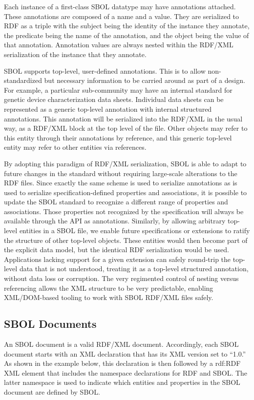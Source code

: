 Each instance of a first-class SBOL datatype may have annotations attached. These annotations are composed of a name and a value.  They are serialized to RDF as a triple with the subject being the identity of the instance they annotate, the predicate being the name of the annotation, and the object being the value of that annotation. Annotation values are always nested within the RDF/XML serialization of the instance that they annotate.

SBOL supports top-level, user-defined annotations. This is to allow non-standardized but necessary information to be carried around as part of a design. For example, a particular sub-community may have an internal standard for genetic device characterization data sheets. 
Individual data sheets can be represented as a generic top-level annotation with internal structured annotations. This annotation will be serialized into the RDF/XML in the usual way, as a RDF/XML block at the top level of the file. Other objects may refer to this entity through their annotations by reference, and this generic top-level entity may refer to other entities via references.

By adopting this paradigm of RDF/XML serialization, SBOL is able to adapt to future changes in the standard without requiring large-scale alterations to the RDF files. Since exactly the same scheme is used to serialize annotations as is used to serialize specification-defined properties and associations, it is possible to update the SBOL standard to recognize a different range of properties and associations. Those properties not recognized by the specification will always be available through the API as annotations. Similarly, by allowing arbitrary top-level entities in a SBOL file, we enable future specifications or extensions to ratify the structure of other top-level objects. These entities would then become part of the explicit data model, but the identical RDF serialization would be used. Applications lacking support for a given extension can safely round-trip the top-level data that is not understood, treating it as a top-level structured annotation, without data loss or corruption. The very regimented control of nesting versus referencing allows the XML structure to be very predictable, enabling XML/DOM-based tooling to work with SBOL RDF/XML files safely.

\subsection {SBOL Documents}
An SBOL document is a valid RDF/XML document. Accordingly, each SBOL document starts with an XML declaration that has its XML version set to ``1.0.'' As shown in the example below, this declaration is then followed by a rdf:RDF XML element that includes the namespace declarations for RDF and SBOL. The latter namespace is used to indicate which entities and properties in the SBOL document are defined by SBOL.

